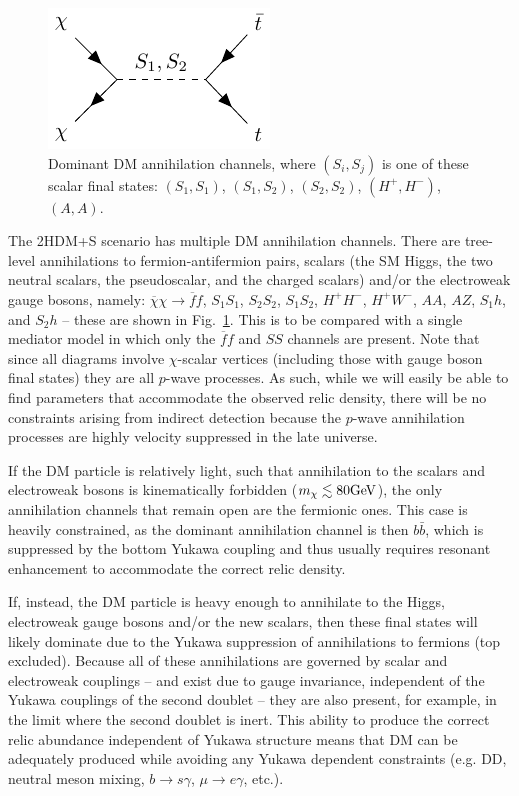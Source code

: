 \begin{figure}
    \includegraphics{texinputs/05_relic/figures/relic_scalar/XXtt.pdf} 
    \caption{Dominant DM annihilation channels, where $(S_i,S_j)$ is one of these scalar final states: $(S_1,S_1)$, $ (S_1,S_2)$, $(S_2,S_2)$, $(H^+,H^-)$, $(A,A)$.}
    \label{fig:feyn}
\end{figure}

The 2HDM+S scenario has multiple DM annihilation channels.
There are tree-level annihilations to fermion-antifermion pairs,
scalars (the SM Higgs, the two neutral scalars, the pseudoscalar, and the
charged scalars) and/or the electroweak gauge bosons,
namely: $\overline{\chi}\chi \rightarrow \overline{f}f$, $S_1 S_1$, $S_2
S_2$, $S_1 S_2$, $H^+ H^-$, $H^+ W^-$, $A A$, $A Z$, $S_1 h$, and $S_2
h$ -- these are shown in Fig.~\ref{fig:feyn}. This is to be compared with a single mediator model in which only
the $\overline{f}f$ and $SS$ channels are present. Note that since all
diagrams involve $\chi$-scalar vertices (including those with gauge
boson final states) they are all $p$-wave processes. As such, while we
will easily be able to find parameters that accommodate the observed
relic density, there will be no constraints arising from indirect
detection because the $p$-wave annihilation processes are highly velocity
suppressed in the late universe.


If the DM particle is relatively light, such that annihilation to the
scalars and electroweak bosons is kinematically forbidden ($m_\chi \lesssim
80\textrm{GeV}$), the only annihilation channels that remain open are the
fermionic ones.  This case is heavily constrained, as the dominant
annihilation channel is then $b\bar{b}$, which is suppressed by the
bottom Yukawa coupling and thus usually requires resonant enhancement
to accommodate the correct relic density.


If, instead, the DM particle is heavy enough to annihilate to the Higgs,
electroweak gauge bosons and/or the new scalars, then these final states will
likely dominate due to the Yukawa suppression of annihilations to fermions 
(top excluded).
Because all of these annihilations are governed by scalar and electroweak
couplings -- and exist due to gauge invariance, independent of the
Yukawa couplings of the second doublet -- they are also present,
for example, in the limit where the second doublet is inert.
This ability to produce the correct relic abundance independent of
Yukawa structure means that DM can be adequately produced while
avoiding any Yukawa dependent constraints (e.g. DD, neutral meson
mixing, $b \to s \gamma$, $\mu \to e \gamma$, etc.).

